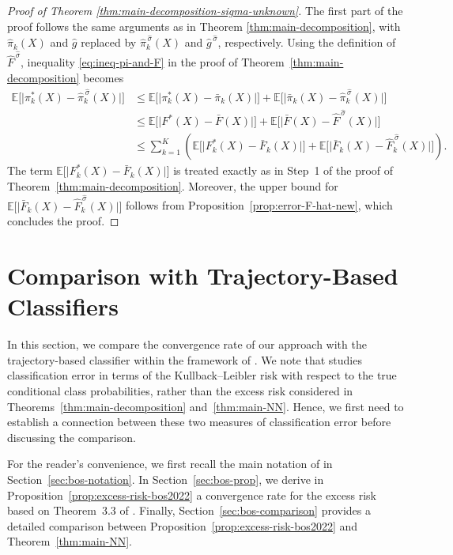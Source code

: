 \documentclass{article}
\theoremstyle{plain}
\theoremstyle{definition}
\theoremstyle{remark}
\newcommand{\EE}{\mathbb{E}}
\begin{document}
\begin{proof}[Proof of Theorem \ref{thm:main-decomposition-sigma-unknown}]
The first part of the proof follows the same arguments as in Theorem \ref{thm:main-decomposition}, with $\widehat \pi_k(X)$ and $\widehat g$ replaced by $\widehat \pi_k^{\,\widehat{\sigma}}(X)$ and $\widehat g^{\,\widehat{\sigma}}$, respectively. Using the definition of $\widehat{F}^{\,\widehat{\sigma}}$, inequality \eqref{eq:ineq-pi-and-F} in the proof of Theorem~\ref{thm:main-decomposition} becomes
\begin{align}\label{eq:ineq-with-F-new}
\EE \big[ \big|\pi_k^*(X)-\widehat \pi_k^{\,\widehat{\sigma}}(X) \big|\big]
&\leq \EE \big[ \big|\pi_k^*(X)-\bar \pi_k(X) \big|\big]
   +\EE \big[ \big|\bar\pi_k(X)-\widehat \pi^{\,\widehat{\sigma}}_k(X) \big|\big] \nonumber\\
&\leq \EE \big[ \big|F^*(X)-\bar F(X) \big|\big]
   +\EE \big[ \big|\bar F(X)-\widehat F^{\,\widehat{\sigma}}(X) \big|\big] \nonumber\\
&\leq \sum_{k=1}^K \left(
\EE \big[ \big|F_k^*(X)-\bar F_k(X) \big|\big]
+\EE \big[ \big|\bar F_k(X)-\widehat F^{\,\widehat{\sigma}}_k(X) \big|\big]
\right).
\end{align}
The term
$
\EE \big[ \big|F_k^*(X)-\bar F_k(X) \big|\big]
$
is treated exactly as in Step~1 of the proof of Theorem~\ref{thm:main-decomposition}. Moreover, the upper bound for
$
\EE \big[ \big|\bar F_k(X)-\widehat F^{\,\widehat{\sigma}}_k(X) \big|\big]
$
follows from Proposition~\ref{prop:error-F-hat-new}, which concludes the proof.
\end{proof}

\section{Comparison with Trajectory-Based Classifiers}\label{app:trajectory-comparison}

In this section, we compare the convergence rate of our approach with the trajectory-based classifier within the framework of \citet{bos2022}. We note that \citet{bos2022} studies classification error in terms of the Kullback--Leibler risk with respect to the true conditional class probabilities, rather than the excess risk considered in Theorems~\ref{thm:main-decomposition} and~\ref{thm:main-NN}. Hence, we first need to establish a connection between these two measures of classification error before discussing the comparison.


For the reader's convenience, we first recall the main notation of \citet{bos2022} in Section~\ref{sec:bos-notation}. In Section~\ref{sec:bos-prop}, we derive in Proposition~\ref{prop:excess-risk-bos2022} a convergence rate for the excess risk based on Theorem~3.3 of \citet{bos2022}. Finally, Section~\ref{sec:bos-comparison} provides a detailed comparison between Proposition~\ref{prop:excess-risk-bos2022} and Theorem~\ref{thm:main-NN}.
\end{document}
